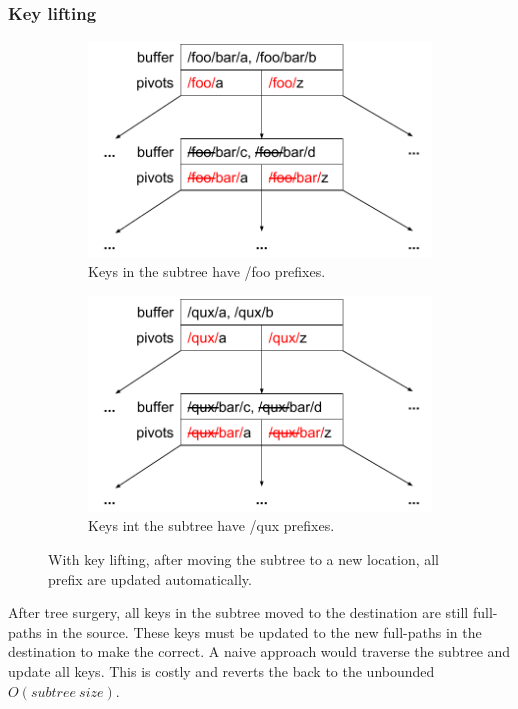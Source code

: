 \subsubsection{Key lifting}

\begin{figure}
  \begin{subfigure}{.45\textwidth}
    \centering
    \includegraphics[width=.9\linewidth]{fig/lift-1}
    \caption{Keys in the subtree have /foo prefixes.}
    \label{subfig:lift-1}
  \end{subfigure}
  \begin{subfigure}{.45\textwidth}
    \centering
    \includegraphics[width=.9\linewidth]{fig/lift-2}
    \caption{Keys int the subtree have /qux prefixes.}
    \label{subfig:lift-2}
  \end{subfigure}
  \caption{With key lifting, after moving the subtree to a new location, all
           prefix are updated automatically.}
  \label{fig:lift}
\end{figure}

After tree surgery, all keys in the subtree moved to the destination are still
full-paths in the source.
These keys must be updated to the new full-paths in the destination to make
the \bet correct.
A naive approach would traverse the subtree and update all keys.
This is costly and reverts the \rr back to the unbounded $O(subtree\ size)$.

